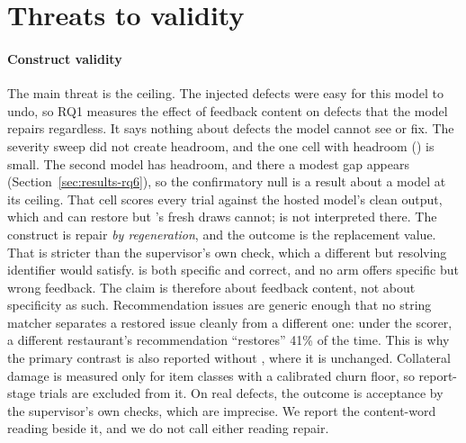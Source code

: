 \section{Threats to validity}
\label{sec:threats}

\paragraph{Construct validity}
The main threat is the ceiling. The injected defects were easy for this model
to undo, so RQ1 measures the effect of feedback content on defects that the
model repairs regardless. It says nothing about defects the model cannot see
or fix. The severity sweep did not create headroom, and the one cell with
headroom () is small. The second model has headroom, and there a modest
gap appears (Section~\ref{sec:results-rq6}), so the confirmatory null is a
result about a model at its ceiling. That cell scores every trial against the
hosted model's clean output, which  and  can restore but
's fresh draws cannot;  is not interpreted there. The
construct is repair \emph{by regeneration}, and
the outcome is the replacement value. That is stricter than the supervisor's
own check, which a different but resolving identifier would satisfy. 
is both specific and correct, and no arm offers specific but wrong feedback.
The claim is therefore about feedback content, not about specificity as such.
Recommendation issues are generic enough that no string matcher separates a
restored issue cleanly from a different one: under the scorer, a different
restaurant's recommendation ``restores'' 41\% of the time. This is why the
primary contrast is also reported without , where it is unchanged.
Collateral damage is measured only for item classes with a calibrated churn
floor, so report-stage trials are excluded from it. On real defects, the
outcome is acceptance by the supervisor's own checks, which are imprecise. We
report the content-word reading beside it, and we do not call either reading
repair.

